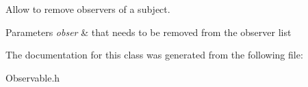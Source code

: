 Allow to remove observers of a subject. 


\begin{DoxyParams}{Parameters}
{\em obser} & that needs to be removed from the observer list \\
\hline
\end{DoxyParams}


The documentation for this class was generated from the following file\+:\begin{DoxyCompactItemize}
\item 
Observable.\+h\end{DoxyCompactItemize}
